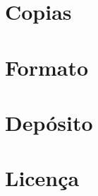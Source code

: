 \documentclass[]{book}
\begin{document}
\hypertarget{copias}{%
\section{Copias}\label{copias}}

\hypertarget{formato-1}{%
\section{Formato}\label{formato-1}}

\hypertarget{deposito}{%
\section{Depósito}\label{deposito}}

\hypertarget{licenca}{%
\section{Licença}\label{licenca}}


\end{document}

